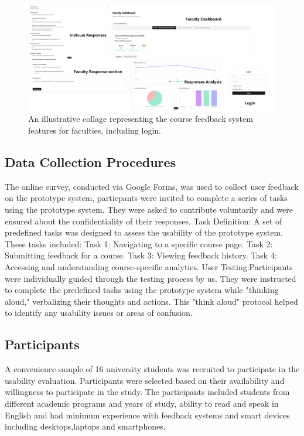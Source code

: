 \documentclass[conference]{IEEEtran}
\begin{document}
\begin{figure}[!h]
    \centering
    \includegraphics[width=\textwidth]{faculty.png}
    \caption{An illustrative collage representing the course feedback system features for faculties, including login.}
    \label{fig:faculty_features}
\end{figure}



\subsection{Data Collection Procedures}
The online survey, conducted via Google Forms, was used to collect user feedback on the prototype system, particpants were invited to complete a series of tasks using the prototype system. They were asked to contribute voluntarily and were ensured about the confidentiality of their responses.
Task Definition: A set of predefined tasks was designed to assess the usability of the prototype system. These tasks included:
     Task 1: Navigating to a specific course page.
    Task 2: Submitting feedback for a course.
     Task 3: Viewing feedback history.
     Task 4: Accessing and understanding course-specific analytics. 
User Testing:Participants were individually guided through the testing process by us. They were instructed to complete the predefined tasks using the prototype system while "thinking aloud," verbalizing their thoughts and actions. This "think aloud" protocol helped to identify any usability issues or areas of confusion.


\subsection{Participants}
A convenience sample of 16 university students was recruited to participate in the usability evaluation. Participants were selected based on their availability and willingness to participate in the study. The participants included students from different academic programs and years of study, ability to read and speak in English and had minimum experience with feedback systems and smart devices including desktops,laptops and smartphones.
\end{document}
